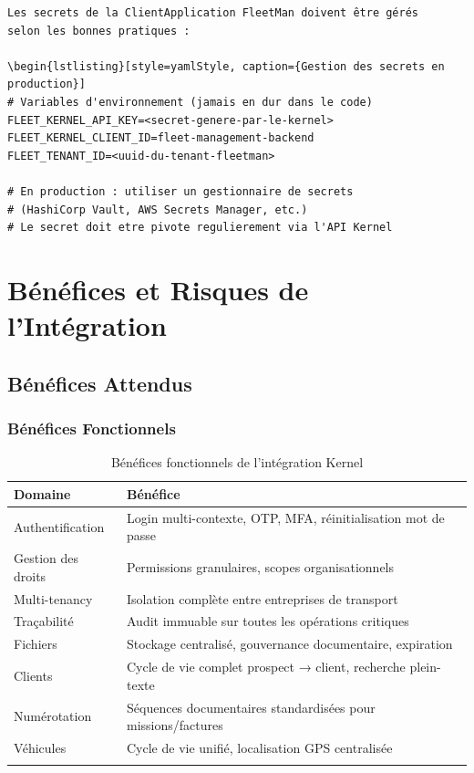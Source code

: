 \documentclass[12pt,a4paper]{report}
\begin{document}
\begin{lstlisting}[style=javaStyle, caption={Circuit Breaker vers le Kernel}]
Les secrets de la ClientApplication FleetMan doivent être gérés
selon les bonnes pratiques :

\begin{lstlisting}[style=yamlStyle, caption={Gestion des secrets en production}]
# Variables d'environnement (jamais en dur dans le code)
FLEET_KERNEL_API_KEY=<secret-genere-par-le-kernel>
FLEET_KERNEL_CLIENT_ID=fleet-management-backend
FLEET_TENANT_ID=<uuid-du-tenant-fleetman>

# En production : utiliser un gestionnaire de secrets
# (HashiCorp Vault, AWS Secrets Manager, etc.)
# Le secret doit etre pivote regulierement via l'API Kernel
\end{lstlisting}

\chapter{Bénéfices et Risques de l'Intégration}

\section{Bénéfices Attendus}

\subsection{Bénéfices Fonctionnels}

\begin{longtable}{p{4cm}p{9cm}}
\toprule
\textbf{Domaine} & \textbf{Bénéfice} \\
\midrule
\endhead
Authentification & Login multi-contexte, OTP, MFA, réinitialisation mot de passe \\
Gestion des droits & Permissions granulaires, scopes organisationnels \\
Multi-tenancy & Isolation complète entre entreprises de transport \\
Traçabilité & Audit immuable sur toutes les opérations critiques \\
Fichiers & Stockage centralisé, gouvernance documentaire, expiration \\
Clients & Cycle de vie complet prospect → client, recherche plein-texte \\
Numérotation & Séquences documentaires standardisées pour missions/factures \\
Véhicules & Cycle de vie unifié, localisation GPS centralisée \\
\bottomrule
\caption{Bénéfices fonctionnels de l'intégration Kernel}
\end{longtable}
\end{document}
